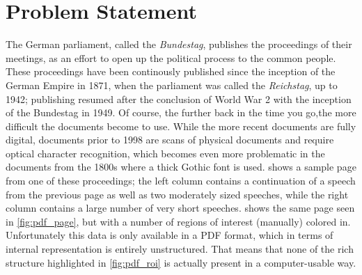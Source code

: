 \section{Problem Statement}%
\label{sec:problem}
The German parliament, called the \emph{Bundestag}, publishes the proceedings of
their meetings, as an effort to open up the political process to the common
people. These proceedings have been continously published since the inception of
the German Empire in 1871, when the parliament was called the \emph{Reichstag},
up to 1942; publishing resumed after the conclusion of World War 2 with the
inception of the Bundestag in 1949. Of course, the further back in the time you
go,the more difficult the documents become to use. While the more recent
documents are fully digital, documents prior to 1998 are scans of physical
documents and require optical character recognition, which becomes even more
problematic in the documents from the 1800s where a thick Gothic font is used.
 shows a sample page from one of these proceedings; the
left column contains a continuation of a speech from the previous page as well
as two moderately sized speeches, while the right column contains a large number
of very short speeches.  shows the same page seen in
\cref{fig:pdf_page}, but with a number of regions of interest (manually)
colored in. Unfortunately this data is only available in a PDF format, which in
terms of internal representation is entirely unstructured. That means that none
of the rich structure highlighted in \cref{fig:pdf_roi} is actually
present in a computer-usable way.

